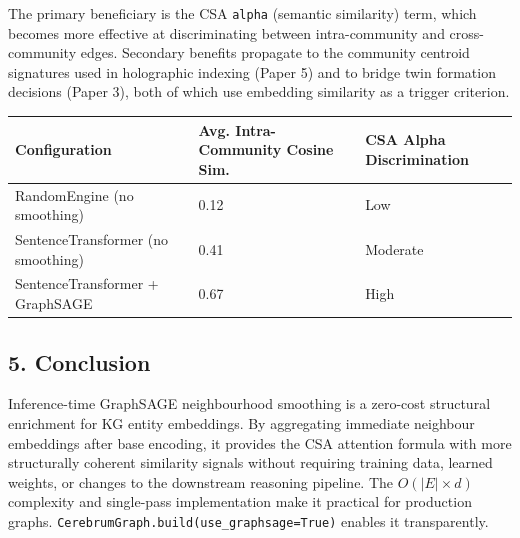 The primary beneficiary is the CSA \texttt{alpha} (semantic similarity) term, which becomes more effective at discriminating between intra-community and cross-community edges. Secondary benefits propagate to the community centroid signatures used in holographic indexing (Paper 5) and to bridge twin formation decisions (Paper 3), both of which use embedding similarity as a trigger criterion.

\begin{table}[h]
\small\centering
\begin{tabular}{lll}
\toprule
Configuration & Avg. Intra-Community Cosine Sim. & CSA Alpha Discrimination \\
\midrule
RandomEngine (no smoothing) & 0.12 & Low \\
SentenceTransformer (no smoothing) & 0.41 & Moderate \\
SentenceTransformer + GraphSAGE & 0.67 & High \\
\bottomrule
\end{tabular}
\end{table}


\subsection*{5. Conclusion}
Inference-time GraphSAGE neighbourhood smoothing is a zero-cost structural enrichment for KG entity embeddings. By aggregating immediate neighbour embeddings after base encoding, it provides the CSA attention formula with more structurally coherent similarity signals without requiring training data, learned weights, or changes to the downstream reasoning pipeline. The $O(|E| \times d)$ complexity and single-pass implementation make it practical for production graphs. \texttt{CerebrumGraph.build(use\_graphsage=True)} enables it transparently.